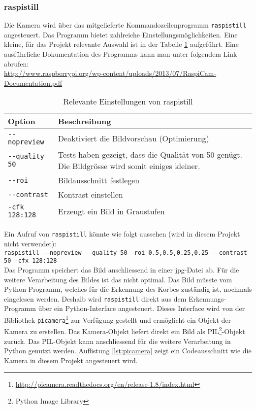 \subsubsection{raspistill}
\label{subsub:raspistill}
Die Kamera wird über das mitgelieferte Kommandozeilenprogramm \verb|raspistill| angesteuert. Das Programm bietet zahlreiche Einstellungsmöglichkeiten. Eine kleine, für das Projekt relevante Auswahl ist in der Tabelle \ref{tab:raspistill} aufgeführt. Eine ausführliche Dokumentation des Programms kann man unter folgendem Link abrufen: \\

\href{http://www.raspberrypi.org/wp-content/uploads/2013/07/RaspiCam-Documentation.pdf}{http://www.raspberrypi.org/wp-content/uploads/2013/07/RaspiCam-Documentation.pdf} \\

\begin{table}[h!]
	\renewcommand{\arraystretch}{1.5}
	\begin{tabular}{|l|p{14cm}|}
		\hline Option & Beschreibung \\ 
		\hline \verb|--nopreview| & Deaktiviert die Bildvorschau (Optimierung) \\ 
		\hline  \verb|--quality 50| & Tests haben gezeigt, dass die Qualität von 50 genügt. Die Bildgrösse wird somit einiges kleiner. \\ 
		\hline  \verb|--roi| & Bildausschnitt festlegen \\ 
		\hline  \verb|--contrast| & Kontrast einstellen \\ 
		\hline  \verb|-cfk 128:128| & Erzeugt ein Bild in Graustufen \\ 
		\hline 
	\end{tabular} 
	\caption{Relevante Einstellungen von raspistill}
	\label{tab:raspistill}
\end{table}

Ein Aufruf von \verb|raspistill| könnte wie folgt aussehen (wird in diesem Projekt nicht verwendet): \\

\verb|raspistill --nopreview --quality 50 -roi 0.5,0.5,0.25,0.25 --contrast 50 -cfx 128:128| \\

Das Programm speichert das Bild anschliessend in einer jpg-Datei ab. Für die weitere Verarbeitung des Bildes ist das nicht optimal. Das Bild müsste vom Python-Programm, welches für die Erkennung des Korbes zuständig ist, nochmals eingelesen werden. Deshalb wird \verb|raspistill| direkt aus dem Erkennungs-Programm über ein Python-Interface angesteuert. Dieses Interface wird von der Bibliothek \verb|picamera|\footnote{\href{http://picamera.readthedocs.org/en/release-1.8/index.html}{http://picamera.readthedocs.org/en/release-1.8/index.html}} zur Verfügung gestellt und ermöglicht ein Objekt der Kamera zu erstellen. Das Kamera-Objekt liefert direkt ein Bild als PIL\footnote{Python Image Library}-Objekt zurück. Das PIL-Objekt kann anschliessend für die weitere Verarbeitung in Python genutzt werden. Auflistung \ref{lst:picamera} zeigt ein Codeausschnitt wie die Kamera in diesem Projekt angesteuert wird.

